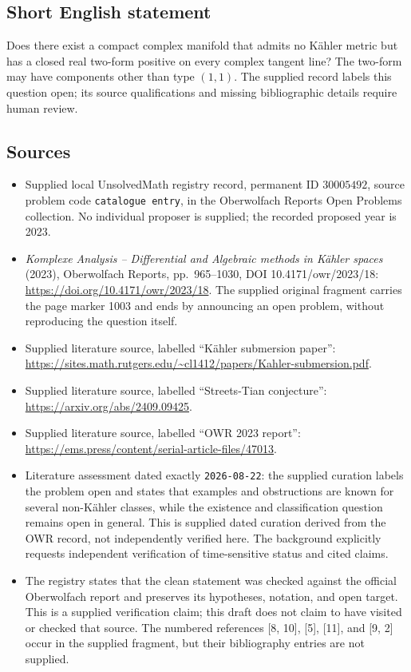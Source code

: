 \documentclass[11pt]{article}
\begin{document}
\subsection{Short English statement}
Does there exist a compact complex manifold that admits no Kähler metric but has a closed real two-form positive on every complex tangent line? The two-form may have components other than type \((1,1)\). The supplied record labels this question open; its source qualifications and missing bibliographic details require human review.
\subsection{Sources}
\begin{itemize}
\item Supplied local UnsolvedMath registry record, permanent ID \(30005492\), source problem code \texttt{catalogue entry}, in the Oberwolfach Reports Open Problems collection. No individual proposer is supplied; the recorded proposed year is 2023.
\item \emph{Komplexe Analysis -- Differential and Algebraic methods in Kähler spaces} (2023), Oberwolfach Reports, pp.\ 965--1030, DOI 10.4171/owr/2023/18: \url{https://doi.org/10.4171/owr/2023/18}. The supplied original fragment carries the page marker 1003 and ends by announcing an open problem, without reproducing the question itself.
\item Supplied literature source, labelled ``Kähler submersion paper'': \url{https://sites.math.rutgers.edu/~cl1412/papers/Kahler-submersion.pdf}.
\item Supplied literature source, labelled ``Streets-Tian conjecture'': \url{https://arxiv.org/abs/2409.09425}.
\item Supplied literature source, labelled ``OWR 2023 report'': \url{https://ems.press/content/serial-article-files/47013}.
\item Literature assessment dated exactly \texttt{2026-08-22}: the supplied curation labels the problem open and states that examples and obstructions are known for several non-Kähler classes, while the existence and classification question remains open in general. This is supplied dated curation derived from the OWR record, not independently verified here. The background explicitly requests independent verification of time-sensitive status and cited claims.
\item The registry states that the clean statement was checked against the official Oberwolfach report and preserves its hypotheses, notation, and open target. This is a supplied verification claim; this draft does not claim to have visited or checked that source. The numbered references [8, 10], [5], [11], and [9, 2] occur in the supplied fragment, but their bibliography entries are not supplied.
\end{itemize}
\end{document}

